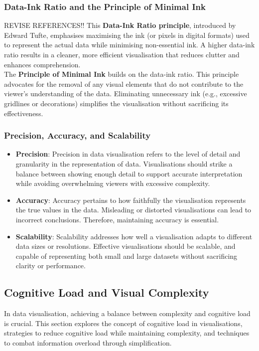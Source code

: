 \documentclass{article}\usepackage[]{graphicx}\usepackage[]{xcolor}
\begin{document}
\subsubsection{Data-Ink Ratio and the Principle of Minimal Ink} REVISE REFERENCES!!
This \textbf{Data-Ink Ratio principle}, introduced by Edward Tufte, emphasises maximising the ink (or pixels in digital formats) used to represent the actual data while minimising non-essential ink. A higher data-ink ratio results in a cleaner, more efficient visualisation that reduces clutter and enhances comprehension.\\
The \textbf{Principle of Minimal Ink} builds on the data-ink ratio. This principle advocates for the removal of any visual elements that do not contribute to the viewer's understanding of the data. Eliminating unnecessary ink (e.g., excessive gridlines or decorations) simplifies the visualisation without sacrificing its effectiveness.

\subsubsection{Precision, Accuracy, and Scalability}
\begin{itemize}
    \item \textbf{Precision}: Precision in data visualisation refers to the level of detail and granularity in the representation of data. Visualisations should strike a balance between showing enough detail to support accurate interpretation while avoiding overwhelming viewers with excessive complexity.
    \item \textbf{Accuracy}: Accuracy pertains to how faithfully the visualisation represents the true values in the data. Misleading or distorted visualisations can lead to incorrect conclusions. Therefore, maintaining accuracy is essential.
    \item \textbf{Scalability}: Scalability addresses how well a visualisation adapts to different data sizes or resolutions. Effective visualisations should be scalable, and capable of representing both small and large datasets without sacrificing clarity or performance.
\end{itemize}

\subsection{Cognitive Load and Visual Complexity}
In data visualisation, achieving a balance between complexity and cognitive load is crucial. This section explores the concept of cognitive load in visualisations, strategies to reduce cognitive load while maintaining complexity, and techniques to combat information overload through simplification.
\end{document}

